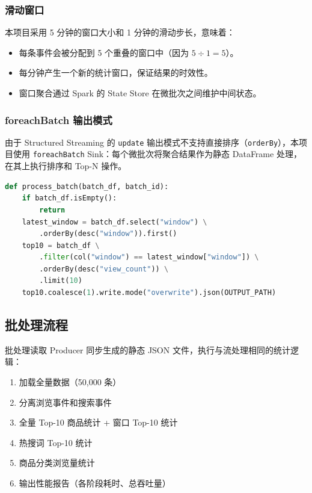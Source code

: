 \documentclass[12pt,a4paper]{article}
\begin{document}
\subsubsection{滑动窗口}

本项目采用 5 分钟的窗口大小和 1 分钟的滑动步长，意味着：

\begin{itemize}    \item 每条事件会被分配到 5 个重叠的窗口中（因为 $5 \div 1 = 5$）。
    \item 每分钟产生一个新的统计窗口，保证结果的时效性。
    \item 窗口聚合通过 Spark 的 State Store 在微批次之间维护中间状态。
\end{itemize}

\subsubsection{foreachBatch 输出模式}

由于 Structured Streaming 的 \texttt{update} 输出模式不支持直接排序（\texttt{orderBy}），本项目使用 \texttt{foreachBatch} Sink：每个微批次将聚合结果作为静态 DataFrame 处理，在其上执行排序和 Top-N 操作。

\begin{lstlisting}[language=Python, caption={foreachBatch 中取 Top-10}]
def process_batch(batch_df, batch_id):
    if batch_df.isEmpty():
        return
    latest_window = batch_df.select("window") \
        .orderBy(desc("window")).first()
    top10 = batch_df \
        .filter(col("window") == latest_window["window"]) \
        .orderBy(desc("view_count")) \
        .limit(10)
    top10.coalesce(1).write.mode("overwrite").json(OUTPUT_PATH)
\end{lstlisting}

\subsection{批处理流程}

批处理读取 Producer 同步生成的静态 JSON 文件，执行与流处理相同的统计逻辑：

\begin{enumerate}    \item 加载全量数据（50,000 条）
    \item 分离浏览事件和搜索事件
    \item 全量 Top-10 商品统计 + 窗口 Top-10 统计
    \item 热搜词 Top-10 统计
    \item 商品分类浏览量统计
    \item 输出性能报告（各阶段耗时、总吞吐量）
\end{enumerate}
\end{document}
